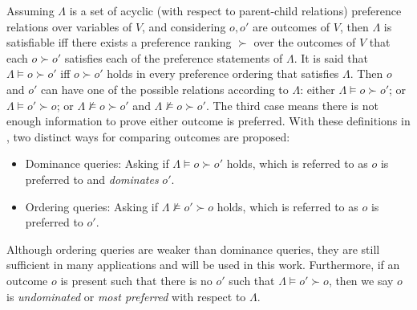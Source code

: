 \documentclass[sigconf,anonymous]{aamas}
\begin{document}
Assuming $\Lambda$ is a set of acyclic (with respect to parent-child relations) preference relations over variables of $V$, and considering $o,o'$ are outcomes of $V$, then $\Lambda$ is satisfiable iff there exists a preference ranking $\succ$ over the outcomes of $V$ that each $o \succ o'$ satisfies each of the preference statements of $\Lambda$. It is said that $\Lambda \models o \succ o'$ iff $o \succ o'$ holds in every preference ordering that satisfies $\Lambda$. Then $o$ and $o'$ can have one of the possible relations according to $\Lambda$: either $\Lambda \models o \succ o'$; or $\Lambda \models o' \succ o$; or $\Lambda \not\models o \succ o'$ and $\Lambda \not\models o \succ o'$. The third case means there is not enough information to prove either outcome is preferred. With these definitions in \cite{Boutilier2004}, two distinct ways for comparing outcomes are proposed:

\begin{itemize}
    \item Dominance queries: Asking if $\Lambda \models o \succ o'$ holds, which is referred to as $o$ is preferred to and \textit{dominates} $o'$.
    \item Ordering queries: Asking if $\Lambda \not\models o' \succ o$ holds, which is referred to as $o$ is preferred to $o'$.
\end{itemize}

Although ordering queries are weaker than dominance queries, they are still sufficient in many applications and will be used in this work. Furthermore, if an outcome $o$ is present such that there is no $o'$ such that $\Lambda \models o' \succ o$, then we say $o$ is \textit{undominated} or \textit{most preferred} with respect to $\Lambda$.


\end{document}
